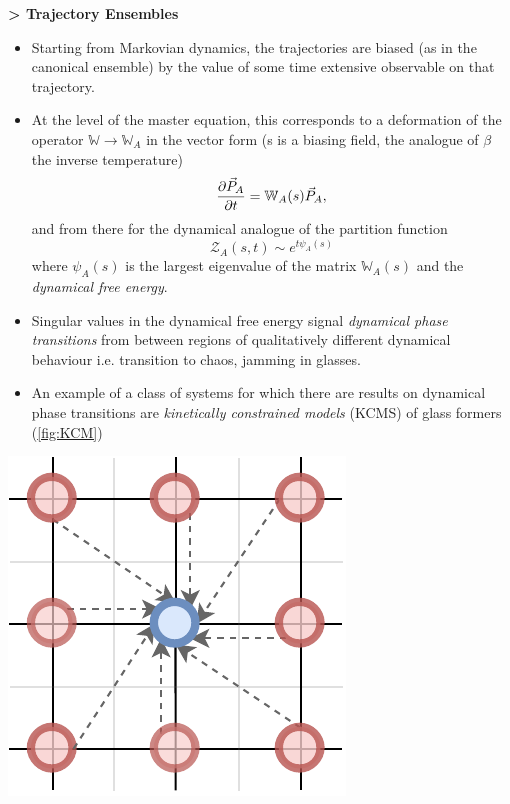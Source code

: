 \documentclass[a0,portrait]{a0poster}
\newenvironment{Section}[1]				%
{
\par 
\flushleft
\colorbox{boxcol}{%
\sffamily\large\bf\color{headingcol}> \color{white} #1%
\hspace{0.5cm}}
\par\nobreak 
\nointerlineskip 						%
\setlength\parskip{-1pt}					%
\begin{lrbox}\envbox						%
\begin{minipage}{0.95\columnwidth}		%
}
{\par
\end{minipage}\end{lrbox}				%
\fcolorbox{boxcol}{fillcol}{\usebox\envbox}	%
\vspace{1cm}							%
}
\begin{document}
\begin{multicols}{3}
\begin{Section}{Trajectory Ensembles}
\begin{itemize}
\item Starting from Markovian dynamics, the trajectories are biased (as in the canonical ensemble) by the value of some time extensive observable on that trajectory.

\item At the level of the master equation, this corresponds to a deformation of the operator $\mathbb{W} \rightarrow \mathbb{W}_A$ in the vector form (s is a biasing field, the analogue of $\beta$ the inverse temperature)
\begin{equation}
    \pdv{\vec{P}_A}{t} = \mathbb{W}_A(s) \vec{P}_A,
\end{equation}
and from there for the dynamical analogue of the partition function
\begin{equation}
    \mathcal{Z}_A(s, t) \sim e^{t \psi_A(s)}
\end{equation}
where $\psi_A(s)$ is the largest eigenvalue of the matrix $\mathbb{W}_A(s)$ and the \emph{dynamical free energy}.
\item Singular values in the dynamical free energy signal \emph{dynamical phase transitions} from between regions of qualitatively different dynamical behaviour i.e. transition to chaos, jamming in glasses.
\item An example of a class of systems for which there are results on dynamical phase transitions are \emph{kinetically constrained models} (KCMS) of glass formers (\ref{fig:KCM})

\end{itemize}
\includegraphics[width=\linewidth]{kcm}
 \label{fig:KCM}
\end{Section}
%
%


\end{multicols}
\end{document}
